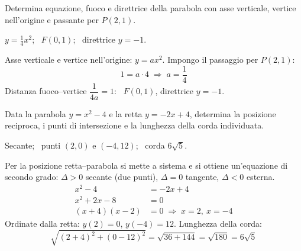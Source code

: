 
\begin{question}[ID=1.10, subtitle={Parabola verticale per l'origine passante per $P(2,1)$}, difficulty=difficile, tags={parabola}]
Determina equazione, fuoco e direttrice della parabola con asse verticale, vertice nell'origine e passante per $P(2,1)$.
\begin{solution}
$y=\tfrac14x^2$; \ $F(0,1)$; \ direttrice $y=-1$.
\end{solution}
\begin{explanation}
Asse verticale e vertice nell'origine: $y=ax^2$. Impongo il passaggio per $P(2,1)$:
\[ 1=a\cdot4 \;\Rightarrow\; a=\dfrac14 \]
Distanza fuoco–vertice $\dfrac{1}{4a}=1$: \ $F(0,1)$, direttrice $y=-1$.
\end{explanation}
\end{question}


\begin{question}[ID=2.1, subtitle={Posizione di $y=x^2-4$ e $y=-2x+4$ con corda}, difficulty=facile, tags={parabola, retta, corda}]
Data la parabola $y=x^2-4$ e la retta $y=-2x+4$, determina la posizione reciproca, i punti di intersezione e la lunghezza della corda individuata.
\begin{solution}
Secante; \ punti $(2,0)$ e $(-4,12)$; \ corda $6\sqrt5$.
\end{solution}
\begin{explanation}
Per la posizione retta–parabola si mette a sistema e si ottiene un'equazione di secondo grado: $\Delta>0$ secante (due punti), $\Delta=0$ tangente, $\Delta<0$ esterna.
\[\begin{aligned}
x^2-4 &= -2x+4\\
x^2+2x-8 &= 0\\
(x+4)(x-2) &= 0 \;\Rightarrow\; x=2,\ x=-4
\end{aligned}\]
Ordinate dalla retta: $y(2)=0$, $y(-4)=12$. Lunghezza della corda:
\[ \sqrt{(2+4)^2+(0-12)^2}=\sqrt{36+144}=\sqrt{180}=6\sqrt5 \]
\end{explanation}
\end{question}


